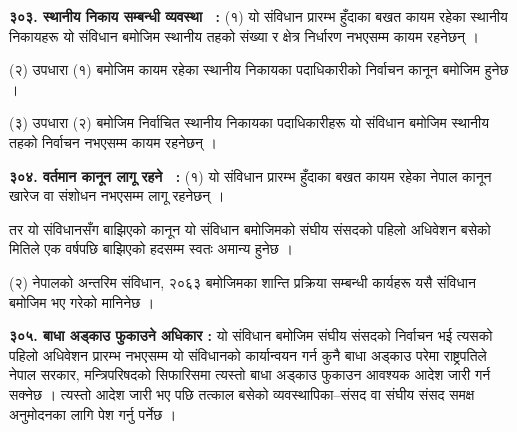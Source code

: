 \textbf{३०३. स्थानीय निकाय सम्बन्धी व्यवस्था  :} (१) यो संविधान प्रारम्भ हुँदाका बखत कायम रहेका स्थानीय निकायहरू यो संविधान बमोजिम स्थानीय तहको संख्या र क्षेत्र निर्धारण नभएसम्म कायम रहनेछन् ।

(२) उपधारा (१) बमोजिम कायम रहेका स्थानीय निकायका पदाधिकारीको निर्वाचन कानून बमोजिम हुनेछ ।

(३) उपधारा (२) बमोजिम निर्वाचित स्थानीय निकायका पदाधिकारीहरू यो संविधान बमोजिम स्थानीय तहको निर्वाचन नभएसम्म कायम रहनेछन् ।

\textbf{३०४. वर्तमान कानून लागू रहने  :} (१) यो संविधान प्रारम्भ हुँदाका बखत कायम रहेका नेपाल कानून खारेज वा संशोधन नभएसम्म लागू रहनेछन् ।

तर यो संविधानसँग बाझिएको कानून यो संविधान बमोजिमको संघीय संसदको पहिलो अधिवेशन बसेको मितिले एक वर्षपछि बाझिएको हदसम्म स्वतः अमान्य हुनेछ ।

(२) नेपालको अन्तरिम संविधान, २०६३ बमोजिमका शान्ति प्रक्रिया सम्बन्धी कार्यहरू यसै संविधान बमोजिम भए गरेको मानिनेछ ।

\textbf{३०५. बाधा अड्काउ फुकाउने अधिकार :} यो संविधान बमोजिम संघीय संसदको निर्वाचन भई त्यसको पहिलो अधिवेशन प्रारम्भ नभएसम्म यो संविधानको कार्यान्वयन गर्न कुनै बाधा अड्काउ परेमा राष्ट्रपतिले नेपाल सरकार, मन्त्रिपरिषदको सिफारिसमा त्यस्तो बाधा अड्काउ फुकाउन आवश्यक आदेश जारी गर्न सक्नेछ । त्यस्तो आदेश जारी भए पछि तत्काल बसेको व्यवस्थापिका–संसद वा संघीय संसद समक्ष अनुमोदनका लागि पेश गर्नु पर्नेछ ।

 